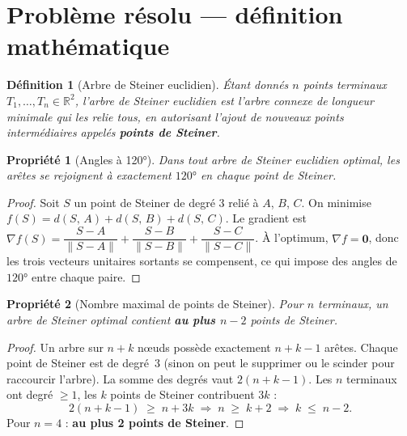 \documentclass[12pt, a4paper]{article}
\newtheorem{definition}{Définition}
\newtheorem{propriete}{Propriété}
\newcommand{\dist}[2]{d\!\left(#1,\,#2\right)}
\begin{document}
\section{Problème résolu — définition mathématique}

\begin{definition}[Arbre de Steiner euclidien]
Étant donnés $n$ points terminaux $T_1, \ldots, T_n \in \mathbb{R}^2$, l'arbre de Steiner
euclidien est l'arbre connexe de longueur minimale qui les relie tous, en autorisant
l'ajout de nouveaux points intermédiaires appelés \textbf{points de Steiner}.
\end{definition}

\begin{propriete}[Angles à 120°]
Dans tout arbre de Steiner euclidien optimal, les arêtes se rejoignent à exactement
$120°$ en chaque point de Steiner.
\end{propriete}

\begin{proof}
Soit $S$ un point de Steiner de degré 3 relié à $A$, $B$, $C$. On minimise
$f(S) = \dist{S}{A} + \dist{S}{B} + \dist{S}{C}$.
Le gradient est $\nabla f(S) = \dfrac{S-A}{\|S-A\|} + \dfrac{S-B}{\|S-B\|} + \dfrac{S-C}{\|S-C\|}$.
À l'optimum, $\nabla f = \mathbf{0}$, donc les trois vecteurs unitaires sortants
se compensent, ce qui impose des angles de $120°$ entre chaque paire.
\end{proof}

\begin{propriete}[Nombre maximal de points de Steiner]
Pour $n$ terminaux, un arbre de Steiner optimal contient \textbf{au plus $n-2$}
points de Steiner.
\end{propriete}

\begin{proof}
Un arbre sur $n + k$ nœuds possède exactement $n + k - 1$ arêtes.
Chaque point de Steiner est de degré~3 (sinon on peut le supprimer ou le scinder
pour raccourcir l'arbre).
La somme des degrés vaut $2(n + k - 1)$.
Les $n$ terminaux ont degré $\geq 1$, les $k$ points de Steiner contribuent $3k$ :
\[
    2(n + k - 1) \;\geq\; n + 3k
    \;\Longrightarrow\; n \;\geq\; k + 2
    \;\Longrightarrow\; k \;\leq\; n - 2.
\]
Pour $n = 4$ : \textbf{au plus 2 points de Steiner}.
\end{proof}

\end{document}
